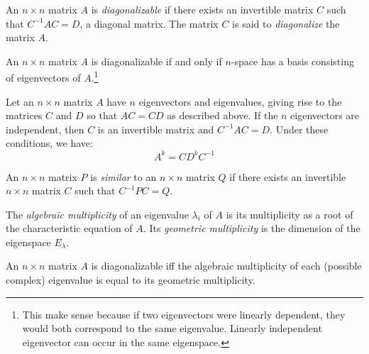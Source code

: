 \documentclass[nobib,notoc]{tufte-handout}
\begin{document}
\begin{defi}[diagonalizable]
	An \(n\times n\) matrix \(A\) is \emph{diagonalizable} if there exists an invertible matrix \(C\) such that \(C^{-1}AC=D\), a diagonal matrix. The matrix \(C\) is said to \emph{diagonalize} the matrix \(A\).
\end{defi}
\begin{cor}
	An \(n\times n\) matrix \(A\) is diagonalizable if and only if \(n\)-space has a basis consisting of eigenvectors of \(A\).\footnote{This make sense because if two eigenvectors were linearly dependent, they would both correspond to the same eigenvalue. Linearly independent eigenvector can occur in the same eigenspace.}
\end{cor}
\begin{cor}
	Let an \(n\times n\) matrix \(A\) have \(n\) eigenvectors and eigenvalues, giving rise to the matrices \(C\) and \(D\) so that \(AC=CD\) as described above. If the \(n\) eigenvectors are independent, then \(C\) is an invertible matrix and \(C^{-1}AC=D\). Under these conditions, we have:
	\begin{equation*}
		A^k=CD^kC^{-1}
	\end{equation*}
\end{cor}
\begin{defi}
	An \(n\times n\) matrix \(P\) is \emph{similar} to an \(n\times n\) matrix \(Q\) if there exists an invertible \(n\times n\) matrix \(C\) such that \(C^{-1}PC=Q\).
\end{defi}
\begin{defi}
	The \emph{algebraic multiplicity} of an eigenvalue \(\lambda_i\) of \(A\) is its multiplicity as a root of the characteristic equation of \(A\). Its \emph{geometric multiplicity} is the dimension of the eigenspace \(E_\lambda\).
\end{defi}
\begin{thm}
	An \(n\times n\) matrix \(A\) is diagonalizable iff the algebraic multiplicity of each (possible complex) eigenvalue is equal to its geometric multiplicity.
\end{thm}
\end{document}
